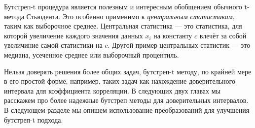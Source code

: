 Бутстреп-t процедура является полезным и интересным обобщением обычного t-метода Стьюдента. Это особенно применимо к \textit{центральным статистикам}, таким как выборочное среднее. Центральная статистика --- это статистика, для которой увеличение каждого значения данных $x_{i}$ на константу $c$ влечёт за собой увеличиние самой статистики на $c$. Другой пример центральных статистик --- это медиана, усеченное среднее или выборочный процентиль.

Нельзя доверять решения более общих задач, бутстреп-t методу, по крайней мере в его простой форме, например, таких задач как нахождение доверительного интервала для коэффициента корреляции. В следующих двух главах мы расскажем про более надежные бутстреп методы для доверительных интервалов. В следующем разделе мы опишем использование преобразований для улучшения бутстреп-t подхода.